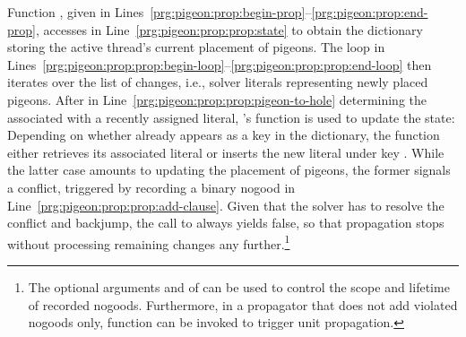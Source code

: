Function , given in Lines~\ref{prg:pigeon:prop:begin-prop}--\ref{prg:pigeon:prop:end-prop},
accesses  in Line~\ref{prg:pigeon:prop:prop:state}
to obtain the  dictionary storing the active thread's current placement of pigeons.
The loop in Lines~\ref{prg:pigeon:prop:prop:begin-loop}--\ref{prg:pigeon:prop:prop:end-loop} then iterates over the list of changes,
i.e., solver literals representing newly placed pigeons.
After in Line~\ref{prg:pigeon:prop:prop:pigeon-to-hole}
determining the  associated with a recently assigned literal,
\python's  function is used to update the state:
Depending on whether  already appears as a key in the  dictionary,
the function either retrieves its associated literal or inserts the new literal under key . %
While the latter case amounts to updating the placement of pigeons, the former signals a conflict,
triggered by recording a binary nogood in Line~\ref{prg:pigeon:prop:prop:add-clause}.
Given that the solver has to resolve the conflict and backjump,
the call to  always yields false, so that
propagation stops without processing remaining changes any further.\footnote{%
  The optional arguments  and  of  can be used to control the scope and lifetime of recorded nogoods.
  Furthermore, in a propagator that does not add violated nogoods only, %
  function  can be invoked to trigger unit propagation.
  }

